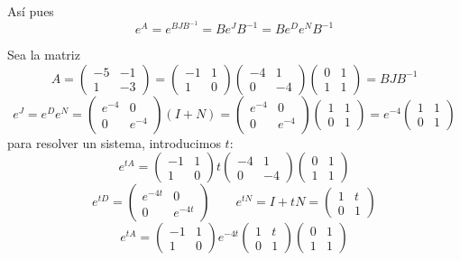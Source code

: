 Así pues
$$e^A=e^{BJB^{-1}}=B e^J B^{-1}=B e^D e^N B^{-1}$$

\begin{eje}
    Sea la matriz $$A=\begin{pmatrix}
        -5 & -1\\
        1 & -3
    \end{pmatrix}=\begin{pmatrix}
        -1 & 1 \\
        1 & 0
    \end{pmatrix}\begin{pmatrix}
        -4 & 1 \\
        0 & -4
    \end{pmatrix}\begin{pmatrix}
        0 & 1 \\
        1 & 1
    \end{pmatrix}=BJB^{-1}$$
    $$e^J=e^D e^N=\begin{pmatrix}
        e^{-4} & 0  \\
        0 & e^{-4}
    \end{pmatrix}(I+N)=\begin{pmatrix}
        e^{-4} & 0 \\
        0 & e^{-4}
    \end{pmatrix}\begin{pmatrix}
        1 & 1 \\
        0 & 1
    \end{pmatrix}=e^{-4}\begin{pmatrix}
        1 & 1 \\
        0 & 1
    \end{pmatrix}$$
    para resolver un sistema, introducimos $t$:
    $$e^{tA}=\begin{pmatrix}
        -1 & 1 \\
        1 & 0
    \end{pmatrix}t\begin{pmatrix}
        -4 & 1 \\
        0 & -4
    \end{pmatrix}\begin{pmatrix}
        0 & 1 \\
        1 & 1
    \end{pmatrix}$$
    $$e^{tD}=\begin{pmatrix}
        e^{-4t} & 0 \\
        0 & e^{-4t}
    \end{pmatrix} \qquad e^{tN}=I+tN=\begin{pmatrix}
        1 & t \\
        0 & 1
    \end{pmatrix}$$
    $$e^{tA}=\begin{pmatrix}
        -1 & 1 \\
        1 & 0
    \end{pmatrix}e^{-4t}\begin{pmatrix}
        1 & t \\
        0 & 1
    \end{pmatrix}\begin{pmatrix}
        0 & 1 \\
        1 & 1
    \end{pmatrix}$$
\end{eje}
